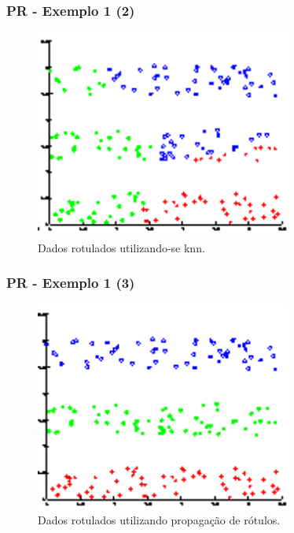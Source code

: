 \documentclass{beamer}
\begin{document}
      \frame
      {
        \frametitle{PR - Exemplo 1 (2)}
        \begin{figure}[!h]
          \begin{center}
                  \includegraphics[width=0.75\textwidth]{prop1-dados-knn}
          \end{center}
            \caption{Dados rotulados utilizando-se knn.}
        \end{figure}
      }

      \frame
      {
        \frametitle{PR - Exemplo 1 (3)}
        \begin{figure}[!h]
          \begin{center}
                  \includegraphics[width=0.75\textwidth]{prop1-dados-rotu}
          \end{center}
            \caption{Dados rotulados utilizando propagação de rótulos.}
        \end{figure}
      }
\end{document}

